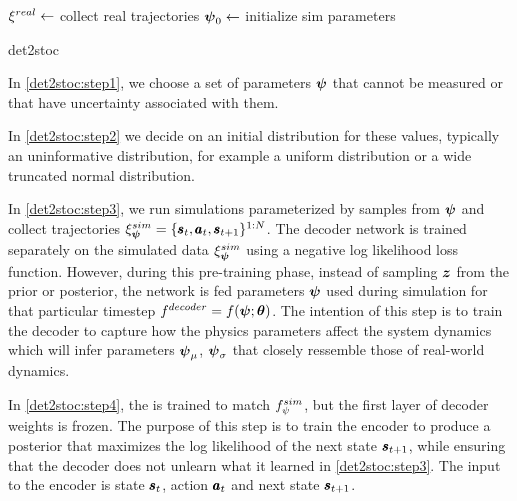 \begin{algorithm}[H]
  \DontPrintSemicolon
  $\xi^{real} \leftarrow$ collect real trajectories \;
  $\boldsymbol{\psi}_0 \leftarrow$ initialize sim parameters \;
  \caption{det2stoc}
  \label{alg:det2stoc}
\end{algorithm}

In \ref{det2stoc:step1}, we choose a set of parameters $\boldsymbol{\psi}$ that cannot be measured or that have uncertainty associated with them.

In \ref{det2stoc:step2} we decide on an initial distribution for these values, typically an uninformative distribution, for example a uniform distribution or a wide truncated normal distribution. 

In \ref{det2stoc:step3}, we run simulations parameterized by samples from $\boldsymbol{\psi}$ and collect trajectories $\xi^{sim}_{\boldsymbol{\psi}}=\{\pmb{s}_t, \pmb{a}_t, \pmb{s}_{t+1}\}^{1:N}$. The decoder network is trained separately on the simulated data $\xi^{sim}_{\boldsymbol{\psi}}{}$ using a negative log likelihood loss function. However, during this pre-training phase, instead of sampling $\boldsymbol{z}$ from the prior or posterior, the network is fed parameters $\boldsymbol{\psi}$ used during simulation for that particular timestep $f^{decoder} = f(\boldsymbol{\psi}; \boldsymbol{\theta})$. The intention of this step is to train the decoder to capture how the physics parameters affect the system dynamics which will infer parameters $\boldsymbol{\psi}_\mu$, $\boldsymbol{\psi}_\sigma$ that closely ressemble those of real-world dynamics.

In \ref{det2stoc:step4}, the \cvae{} is trained to match $f^{sim}_{\psi}{}$, but the first layer of decoder weights is frozen. The purpose of this step is to train the encoder to produce a posterior that maximizes the log likelihood of the next state $\pmb{s}_{t+1}$, while ensuring that the decoder does not unlearn what it learned in \ref{det2stoc:step3}. The input to the encoder is state $\pmb{s}_t$, action $\pmb{a}_t$ and next state $\pmb{s}_{t+1}$. %

